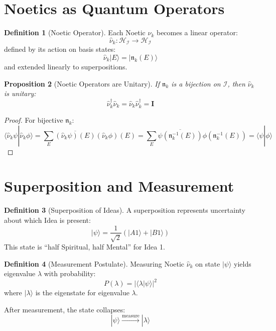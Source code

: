 \documentclass[11pt,twoside,openright]{book}
\theoremstyle{definition}
\newtheorem{definition}{Definition}[chapter]
\theoremstyle{plain}
\newtheorem{proposition}[definition]{Proposition}
\theoremstyle{remark}
\newcommand{\Ideas}{\mathcal{I}}
\newcommand{\noe}[1]{\nu_{#1}}
\newcommand{\Hspace}{\mathcal{H}}
\newcommand{\qket}[1]{|#1\rangle}
\newcommand{\qop}[1]{\hat{#1}}
\begin{document}
\section{Noetics as Quantum Operators}

\begin{definition}[Noetic Operator]
\label{def:noetic-operator}
Each Noetic $\noe{k}$ becomes a linear operator:
\[
\qop{\nu}_k : \Hspace_\Ideas \to \Hspace_\Ideas
\]
defined by its action on basis states:
\[
\qop{\nu}_k \qket{E} = \qket{\mathfrak{n}_k(E)}
\]
and extended linearly to superpositions.
\end{definition}

\begin{proposition}[Noetic Operators are Unitary]
\label{prop:noetic-unitary}
If $\mathfrak{n}_k$ is a bijection on $\Ideas$, then $\qop{\nu}_k$ is unitary:
\[
\qop{\nu}_k^\dagger \qop{\nu}_k = \qop{\nu}_k \qop{\nu}_k^\dagger = \mathbf{I}
\]
\end{proposition}

\begin{proof}
For bijective $\mathfrak{n}_k$:
\[
\langle \qop{\nu}_k \psi | \qop{\nu}_k \phi \rangle = \sum_E \overline{(\qop{\nu}_k \psi)(E)} (\qop{\nu}_k \phi)(E) = \sum_E \overline{\psi(\mathfrak{n}_k^{-1}(E))} \phi(\mathfrak{n}_k^{-1}(E)) = \langle \psi | \phi \rangle
\]
\end{proof}

\section{Superposition and Measurement}

\begin{definition}[Superposition of Ideas]
\label{def:superposition}
A superposition represents uncertainty about which Idea is present:
\[
\qket{\psi} = \frac{1}{\sqrt{2}}(\qket{A1} + \qket{B1})
\]
This state is ``half Spiritual, half Mental'' for Idea 1.
\end{definition}

\begin{definition}[Measurement Postulate]
\label{def:measurement}
Measuring Noetic $\qop{\nu}_k$ on state $\qket{\psi}$ yields eigenvalue $\lambda$ with probability:
\[
P(\lambda) = |\langle \lambda | \psi \rangle|^2
\]
where $\qket{\lambda}$ is the eigenstate for eigenvalue $\lambda$.

After measurement, the state collapses:
\[
\qket{\psi} \xrightarrow{\text{measure}} \qket{\lambda}
\]
\end{definition}
\end{document}
